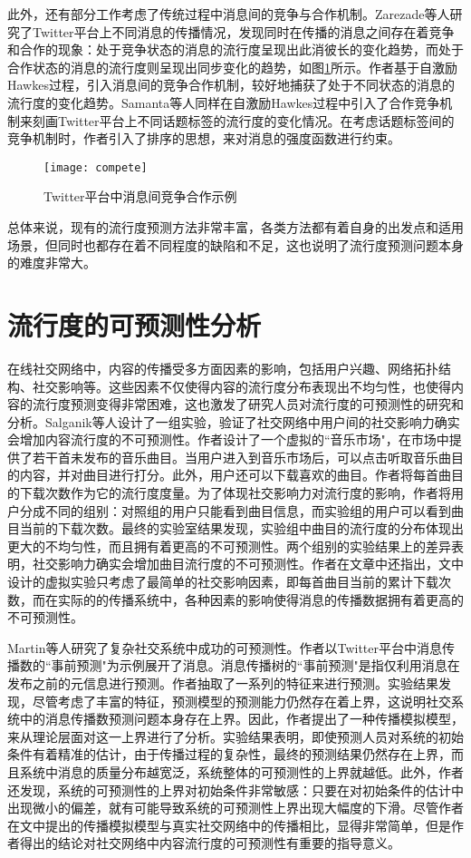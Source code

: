 此外，还有部分工作考虑了传统过程中消息间的竞争与合作机制。Zarezade等人\citep{zarezade2017correlated}研究了Twitter平台上不同消息的传播情况，发现同时在传播的消息之间存在着竞争和合作的现象：处于竞争状态的消息的流行度呈现出此消彼长的变化趋势，而处于合作状态的消息的流行度则呈现出同步变化的趋势，如图\ref{fig:cooperate}所示。作者基于自激励Hawkes过程，引入消息间的竞争合作机制，较好地捕获了处于不同状态的消息的流行度的变化趋势。Samanta等人\citep{samantalmpp}同样在自激励Hawkes过程中引入了合作竞争机制来刻画Twitter平台上不同话题标签的流行度的变化情况。在考虑话题标签间的竞争机制时，作者引入了排序的思想，来对消息的强度函数进行约束。
\begin{figure}[!htbp]
  \centering
  \texttt{[image: compete]}
  \caption{Twitter平台中消息间竞争合作示例\citep{zarezade2017correlated}}
  \label{fig:cooperate}
\end{figure}

总体来说，现有的流行度预测方法非常丰富，各类方法都有着自身的出发点和适用场景，但同时也都存在着不同程度的缺陷和不足，这也说明了流行度预测问题本身的难度非常大。

\section{流行度的可预测性分析}
在线社交网络中，内容的传播受多方面因素的影响，包括用户兴趣、网络拓扑结构、社交影响等。这些因素不仅使得内容的流行度分布表现出不均匀性，也使得内容的流行度预测变得非常困难，这也激发了研究人员对流行度的可预测性的研究和分析。Salganik等人\citep{salganik2006experimental}设计了一组实验，验证了社交网络中用户间的社交影响力确实会增加内容流行度的不可预测性。作者设计了一个虚拟的``音乐市场"，在市场中提供了若干首未发布的音乐曲目。当用户进入到音乐市场后，可以点击听取音乐曲目的内容，并对曲目进行打分。此外，用户还可以下载喜欢的曲目。作者将每首曲目的下载次数作为它的流行度度量。为了体现社交影响力对流行度的影响，作者将用户分成不同的组别：对照组的用户只能看到曲目信息，而实验组的用户可以看到曲目当前的下载次数。最终的实验室结果发现，实验组中曲目的流行度的分布体现出更大的不均匀性，而且拥有着更高的不可预测性。两个组别的实验结果上的差异表明，社交影响力确实会增加曲目流行度的不可预测性。作者在文章中还指出，文中设计的虚拟实验只考虑了最简单的社交影响因素，即每首曲目当前的累计下载次数，而在实际的的传播系统中，各种因素的影响使得消息的传播数据拥有着更高的不可预测性。

Martin等人\citep{martin2016exploring}研究了复杂社交系统中成功的可预测性。作者以Twitter平台中消息传播数的``事前预测"为示例展开了消息。消息传播树的``事前预测"是指仅利用消息在发布之前的元信息进行预测。作者抽取了一系列的特征来进行预测。实验结果发现，尽管考虑了丰富的特征，预测模型的预测能力仍然存在着上界，这说明社交系统中的消息传播数预测问题本身存在上界。因此，作者提出了一种传播模拟模型，来从理论层面对这一上界进行了分析。实验结果表明，即使预测人员对系统的初始条件有着精准的估计，由于传播过程的复杂性，最终的预测结果仍然存在上界，而且系统中消息的质量分布越宽泛，系统整体的可预测性的上界就越低。此外，作者还发现，系统的可预测性的上界对初始条件非常敏感：只要在对初始条件的估计中出现微小的偏差，就有可能导致系统的可预测性上界出现大幅度的下滑。尽管作者在文中提出的传播模拟模型与真实社交网络中的传播相比，显得非常简单，但是作者得出的结论对社交网络中内容流行度的可预测性有重要的指导意义。

